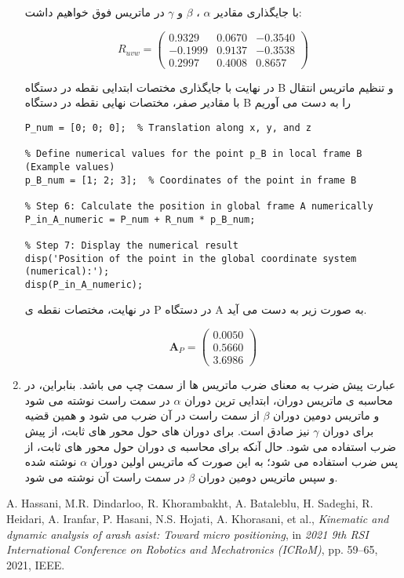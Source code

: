 \begin{enumerate}
با جایگذاری مقادیر $\alpha$ ، $\beta$ و $\gamma$ در ماتریس فوق خواهیم داشت:

\[
R_{uvw} = \left(\begin{array}{ccc} 
	0.9329 & 0.0670 & -0.3540 \\
	-0.1999 & 0.9137 & -0.3538 \\
	0.2997 & 0.4008 & 0.8657
\end{array}\right)
\]

در نهایت با جایگذاری مختصات ابتدایی نقطه در دستگاه B و تنظیم ماتریس انتقال با مقادیر صفر، مختصات نهایی نقطه در دستگاه B را به دست می آوریم

\begin{latin}
	\begin{lstlisting}[frame=single,style=Matlab-Pyglike]
% Define numerical values for the translation vector P (Example values)
P_num = [0; 0; 0];  % Translation along x, y, and z

% Define numerical values for the point p_B in local frame B (Example values)
p_B_num = [1; 2; 3];  % Coordinates of the point in frame B

% Step 6: Calculate the position in global frame A numerically
P_in_A_numeric = P_num + R_num * p_B_num;

% Step 7: Display the numerical result
disp('Position of the point in the global coordinate system (numerical):');
disp(P_in_A_numeric);
	\end{lstlisting}
\end{latin}
در نهایت، مختصات نقطه ی P در دستگاه A به صورت زیر به دست می آید.

\[
\mathbf{A}_P = \left(\begin{array}{c} 
	0.0050 \\
	0.5660 \\
	3.6986
\end{array}\right)
\]

\item 
عبارت پیش ضرب به معنای ضرب ماتریس ها از سمت چپ می باشد. بنابراین، در محاسبه ی ماتریس دوران، ابتدایی ترین دوران $\alpha$ در سمت راست نوشته می شود و ماتریس دومین دوران $\beta$ از سمت راست در آن ضرب می شود و همین قضیه برای دوران $\gamma$ نیز صادق است. برای دوران های حول محور های ثابت، از پیش ضرب استفاده می شود. 
حال آنکه برای محاسبه ی دوران حول محور های ثابت، از پس ضرب استفاده می شود؛ به این صورت که ماتریس اولین دوران $\alpha$ نوشته شده و سپس ماتریس دومین دوران $\beta$ در سمت راست آن نوشته می شود. 

\end{enumerate}


\begin{thebibliography}{9}
	
	A. Hassani, M.R. Dindarloo, R. Khorambakht, A. Bataleblu, H. Sadeghi, R. Heidari, A. Iranfar, P. Hasani, N.S. Hojati, A. Khorasani, et al.,
	\textit{Kinematic and dynamic analysis of arash asist: Toward micro positioning}, 
	in \textit{2021 9th RSI International Conference on Robotics and Mechatronics (ICRoM)}, 
	pp. 59--65, 2021, IEEE.
	
\end{thebibliography}

